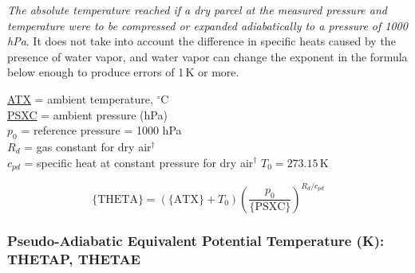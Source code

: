 \documentclass[
]{book}
\begin{document}
\emph{The absolute temperature reached if a dry parcel at the measured pressure and temperature were to be compressed or expanded adiabatically to a pressure of 1000 hPa}. It does not take into account the difference in specific heats caused by the presence of water vapor, and water vapor can change the exponent in the formula below enough to produce errors of 1 K or more.

\protect\hyperlink{ambient-t}{ATX} = ambient temperature, \(^{\circ}\)C\\
\protect\hyperlink{psx}{PSXC} = ambient pressure (hPa)\\
\(p_{0}\) = reference pressure = 1000 hPa\\
\(R_{d}\) = gas constant for dry air\(^{\dagger}\)\\
\(c_{pd}\) = specific heat at constant pressure for dry air\(^{\dagger}\)
\(T_0=273.15\,\mathrm{K}\)

\begin{equation}
\mathrm{\{THETA\}}=\left(\mathrm{\{ATX\}}+T_{0}\right)\left(\frac{p_{0}}{\mathrm{\{PSXC\}}}\right)^{R_{d}/c_{pd}}
\label{eq:THETA}
\end{equation}

\hypertarget{thetae}{%
\subsubsection*{Pseudo-Adiabatic Equivalent Potential Temperature (K): THETAP, THETAE}\label{thetae}}
\end{document}
